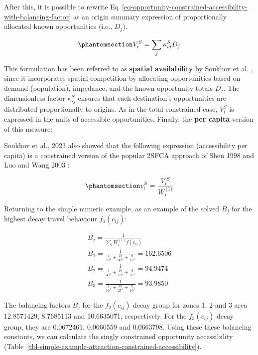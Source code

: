 \documentclass[
  10pt,
  letterpaper,
]{article}
\begin{document}
After this, it is possible to rewrite
Eq~\ref{eq-opportunity-constrained-accessibility-with-balancing-factor}
as an origin summary expression of proportionally allocated known
opportunities (i.e., \(D_j\)).

\begin{equation}\phantomsection\label{eq-attraction-constrained-accessibility-with-proportional-allocation-factor}{
V^S_{i} = \sum_j \kappa^S_{ij} D_j
}\end{equation}

This formulation has been referred to as \textbf{spatial availability}
by Soukhov et al. \citep{soukhovIntroducingSpatialAvailability2023},
since it incorporates spatial competition by allocating opportunities
based on demand (population), impedance, and the known opportunity
totals \(D_j\). The dimensionless factor \(\kappa^S_{ij}\) ensures that
each destination's opportunities are distributed proportionally to
origins. As in the total constrained case, \(V_i^S\) is expressed in the
units of accessible opportunities. Finally, the \textbf{per capita}
version of this measure:

Soukhov et al., 2023 \citep{soukhovIntroducingSpatialAvailability2023}
also showed that the following expression (accessibility per capita) is
a constrained version of the popular 2SFCA approach of Shen 1998
\citep{shen1998} and Luo and Wang 2003 \citep{luo2003}:

\begin{equation}\phantomsection\label{eq-opportunity-constrained-accessibility-per-capita}{
v^S_{i} = \frac{V^S_{i}}{W^{(1)}_i}
}\end{equation}

Returning to the simple numeric example, as an example of the solved
\(B_{j}\) for the highest decay travel behaviour \(f_1(c_{ij})\):

\[
\begin{array}{l}
B_{j} = \frac{1}{\sum_i W_i^{(1)} f(c_{ij})}\\
B_{1} =  \frac{1}{\frac{4}{10^3} + \frac{10}{30^3} + \frac{6}{15^3}} = 162.6506\\ 
B_{2} =  \frac{1}{\frac{4}{30^3} + \frac{10}{10^3} + \frac{6}{25^3}} = 94.9474\\
B_{3} =  \frac{1}{\frac{4}{10^3} + \frac{10}{25^3} + \frac{6}{10^3}} = 93.9850
\end{array}
\]

The balancing factors \(B_j\) for the \(f_2(c_{ij})\) decay group for
zones 1, 2 and 3 area 12.8571429, 8.7685113 and 10.6635071,
respectively. For the \(f_3(c_{ij})\) decay group, they are 0.0672461,
0.0660559 and 0.0663798. Using these these balancing constants, we can
calculate the singly constrained opportunity accessibility
(Table~\ref{tbl-simple-example-attraction-constrained-accessibility}).
\end{document}
